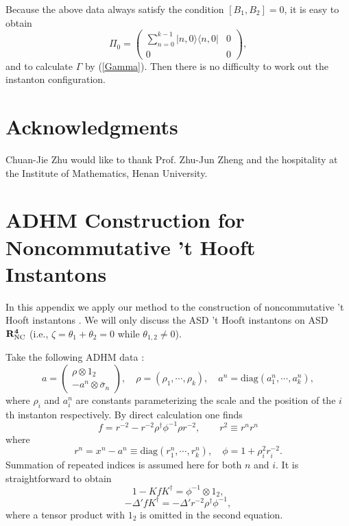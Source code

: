 \documentclass[a4paper,a4paper]{article}
\begin{document}
Because the above data always satisfy the condition $[B_1,B_2]=0$,
it is easy to obtain
\begin{equation}
\Pi_0=\left(\begin{array}{cc} \sum_{n=0}^{k-1}|n,0\rangle\langle
n,0| & 0 \\
0 & 0 \end{array}\right),
\end{equation}
and to calculate $\Gamma$ by (\ref{Gamma}). Then there is no
difficulty to work out the instanton configuration.

\section*{Acknowledgments}

Chuan-Jie Zhu would like to thank Prof. Zhu-Jun Zheng and the
hospitality at the Institute of Mathematics, Henan University.

\appendix

\section{ADHM Construction for Noncommutative 't Hooft Instantons}

In this appendix we apply our method to the construction of
noncommutative 't Hooft instantons \cite{Correa, Lechtenfeld}. We
will only discuss the ASD 't Hooft instantons on ASD $\bf{R}_{\rm
NC}^4$ (i.e., $\zeta=\theta_1+\theta_2=0$ while $\theta_{1,2}\neq
0$).

Take the following ADHM data \cite{Corrigan, Osborn}:
\begin{equation}\label{Hooft}
a=\left(\begin{array}{c} \rho\otimes 1_2 \\
-a^n\otimes\bar\sigma_n
\end{array}\right),\quad
\rho=(\rho_1,\cdots,\rho_k),\quad
a^n=\mathrm{diag}(a_1^n,\cdots,a_k^n),
\end{equation}
where $\rho_i$ and $a_i^n$ are constants parameterizing the scale
and the position of the $i$th instanton respectively. By direct
calculation one finds
\begin{equation}
f=r^{-2}-r^{-2}\rho^\dag\phi^{-1}\rho r^{-2},\qquad r^2\equiv r^n
r^n
\end{equation}
where
\begin{equation}
r^n=x^n-a^n\equiv\mathrm{diag}(r_1^n,\cdots,r_k^n),\quad
\phi=1+\rho_i^2 r_i^{-2}.
\end{equation}
Summation of repeated indices is assumed here for both $n$ and
$i$. It is straightforward to obtain
\begin{equation}
1-KfK^\dag=\phi^{-1}\otimes 1_2,
\end{equation}
\begin{equation}
-\Delta'fK^\dag=-\Delta'r^{-2}\rho^\dag\phi^{-1},
\end{equation}
where a tensor product with $1_2$ is omitted in the second
equation.
\end{document}
